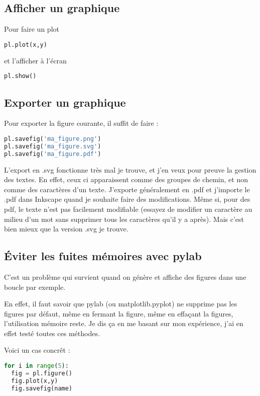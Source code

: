\documentclass[a4paper,twoside]{article}
\begin{document}
\subsection{Afficher un graphique}
Pour faire un plot
\begin{lstlisting}[language=python]
pl.plot(x,y)
\end{lstlisting}
et l'afficher à l'écran
\begin{lstlisting}[language=python]
pl.show()
\end{lstlisting}

\subsection{Exporter un graphique}
Pour exporter la figure courante, il suffit de faire :
\begin{lstlisting}[language=python]
pl.savefig('ma_figure.png')
pl.savefig('ma_figure.svg')
pl.savefig('ma_figure.pdf')
\end{lstlisting}

\begin{remarque}
L'export en .svg fonctionne très mal je trouve, et j'en veux pour preuve la gestion des textes. En effet, ceux ci apparaissent comme des groupes de chemin, et non comme des caractères d'un texte. J'exporte généralement en .pdf et j'importe le .pdf dans Inkscape quand je souhaite faire des modifications. Même si, pour des pdf, le texte n'est pas facilement modifiable (essayez de modifier un caractère au milieu d'un mot sans supprimer tous les caractères qu'il y a après). Mais c'est bien mieux que la version .svg je trouve. 
\end{remarque}


\subsection{Éviter les fuites mémoires avec pylab}\label{sec:pylab-fuite-memoire}
C'est un problème qui survient quand on génère et affiche des figures dans une boucle par exemple. 

En effet, il faut savoir que pylab (ou matplotlib.pyplot) ne supprime pas les figures par défaut, même en fermant la figure, même en effaçant la figures, l'utilisation mémoire reste. Je dis ça en me basant sur mon expérience, j'ai en effet testé toutes ces méthodes. 

Voici un cas concrêt : 
\begin{lstlisting}[language=python]
for i in range(5):
  fig = pl.figure()
  fig.plot(x,y)
  fig.savefig(name)
\end{lstlisting}
\end{document}
